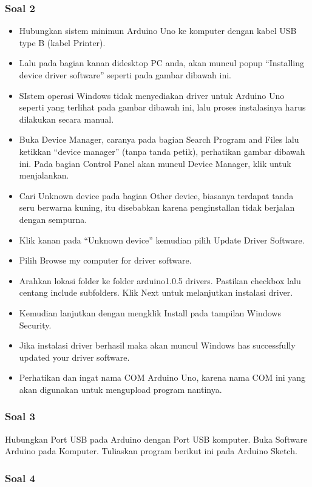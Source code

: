 \subsubsection{Soal 2}
\begin{itemize}
\item Hubungkan sistem minimun Arduino Uno ke komputer dengan kabel USB type B (kabel Printer).
\item Lalu pada bagian kanan didesktop PC anda, akan muncul popup “Installing device driver software” seperti pada gambar dibawah ini.
\item SIstem operasi Windows tidak menyediakan driver untuk Arduino Uno seperti yang terlihat pada gambar dibawah ini, lalu proses instalasinya harus dilakukan secara manual.
\item Buka Device Manager, caranya pada bagian Search Program and Files lalu ketikkan “device manager” (tanpa tanda petik), perhatikan gambar dibawah ini. Pada bagian Control Panel akan muncul Device Manager, klik untuk menjalankan.
\item Cari Unknown device pada bagian Other device, biasanya terdapat tanda seru berwarna kuning, itu disebabkan karena penginstallan tidak berjalan dengan sempurna.
\item Klik kanan pada “Unknown device” kemudian pilih Update Driver Software.
\item Pilih Browse my computer for driver software.
\item Arahkan lokasi folder ke folder arduino1.0.5 drivers. Pastikan checkbox lalu centang include subfolders. Klik Next untuk melanjutkan instalasi driver.
\item Kemudian lanjutkan dengan mengklik Install pada tampilan Windows Security.
\item Jika instalasi driver berhasil maka akan muncul Windows has successfully updated your driver software.
\item Perhatikan dan ingat nama COM Arduino Uno, karena nama COM ini yang akan digunakan untuk mengupload program nantinya.
\end{itemize}

\subsubsection{Soal 3}


Hubungkan Port USB pada Arduino dengan Port USB komputer.
Buka Software Arduino pada Komputer.
Tuliaskan program berikut ini pada Arduino Sketch.

\subsubsection{Soal 4}


